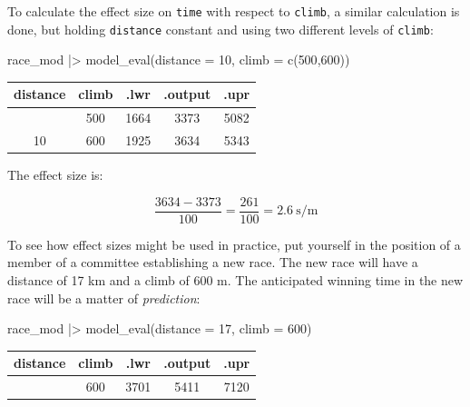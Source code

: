 \documentclass[
  letterpaper,
  DIV=11,
  numbers=noendperiod,
  oneside]{scrartcl}
\newenvironment{Shaded}{\begin{snugshade}}{\end{snugshade}}
\newcommand{\AttributeTok}[1]{\textcolor[rgb]{0.40,0.45,0.13}{#1}}
\newcommand{\DecValTok}[1]{\textcolor[rgb]{0.68,0.00,0.00}{#1}}
\newcommand{\FunctionTok}[1]{\textcolor[rgb]{0.28,0.35,0.67}{#1}}
\newcommand{\NormalTok}[1]{\textcolor[rgb]{0.00,0.23,0.31}{#1}}
\newcommand{\SpecialCharTok}[1]{\textcolor[rgb]{0.37,0.37,0.37}{#1}}
\begin{document}
To calculate the effect size on \texttt{time} with respect to
\texttt{climb}, a similar calculation is done, but holding
\texttt{distance} constant and using two different levels of
\texttt{climb}:

\begin{Shaded}
\begin{Highlighting}[]
\NormalTok{race\_mod }\SpecialCharTok{|\textgreater{}} \FunctionTok{model\_eval}\NormalTok{(}\AttributeTok{distance =} \DecValTok{10}\NormalTok{, }\AttributeTok{climb =} \FunctionTok{c}\NormalTok{(}\DecValTok{500}\NormalTok{,}\DecValTok{600}\NormalTok{))}
\end{Highlighting}
\end{Shaded}

\begin{longtable}[]{@{}ccccc@{}}
\toprule\noalign{}
distance & climb & .lwr & .output & .upr \\
\midrule\noalign{}
\endhead
\bottomrule\noalign{}
\endlastfoot
10 & 500 & 1664 & 3373 & 5082 \\
10 & 600 & 1925 & 3634 & 5343 \\
\end{longtable}

The effect size is:

\[\frac{3634 - 3373}{100} = \frac{261}{100} = 2.6\ \text{s/m}\]

To see how effect sizes might be used in practice, put yourself in the
position of a member of a committee establishing a new race. The new
race will have a distance of 17 km and a climb of 600 m. The anticipated
winning time in the new race will be a matter of \emph{prediction}:

\begin{Shaded}
\begin{Highlighting}[]
\NormalTok{race\_mod }\SpecialCharTok{|\textgreater{}} \FunctionTok{model\_eval}\NormalTok{(}\AttributeTok{distance =} \DecValTok{17}\NormalTok{, }\AttributeTok{climb =} \DecValTok{600}\NormalTok{)}
\end{Highlighting}
\end{Shaded}

\begin{longtable}[]{@{}ccccc@{}}
\toprule\noalign{}
distance & climb & .lwr & .output & .upr \\
\midrule\noalign{}
\endhead
\bottomrule\noalign{}
\endlastfoot
17 & 600 & 3701 & 5411 & 7120 \\
\end{longtable}
\end{document}

